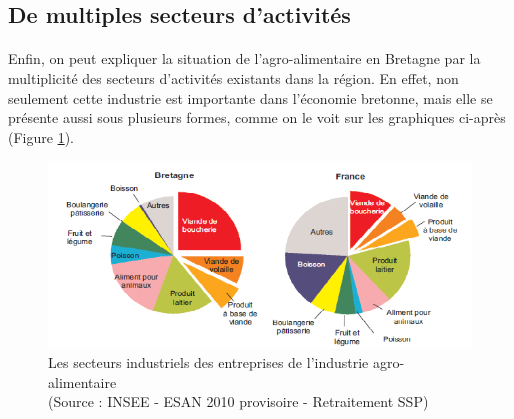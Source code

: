 \documentclass[a4paper,12pt]{report}
\begin{document}
		\subsection{De multiples secteurs d'activités}
			\paragraph{}Enfin, on peut expliquer la situation de l'agro-alimentaire en Bretagne par la multiplicité des secteurs d'activités existants dans la région. En effet, non seulement cette industrie est importante dans l'économie bretonne, mais elle se présente aussi sous plusieurs formes, comme on le voit sur les graphiques ci-après (Figure \ref{SecteursIndustrielsIAA}).
			
			\begin{figure}[!h]
			\centering
			\includegraphics[scale=1]{Illustrations/SecteursIndustrielsIAA.png}
			\caption{Les secteurs industriels des entreprises de l'industrie agro-alimentaire\\(Source : INSEE - ESAN 2010 provisoire - Retraitement SSP)}
			\label{SecteursIndustrielsIAA}
			\end{figure}
			
\end{document}
